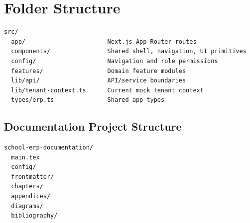\chapter{Folder Structure}
\label{app:folders}
\begin{lstlisting}
src/
  app/                       Next.js App Router routes
  components/                Shared shell, navigation, UI primitives
  config/                    Navigation and role permissions
  features/                  Domain feature modules
  lib/api/                   API/service boundaries
  lib/tenant-context.ts      Current mock tenant context
  types/erp.ts               Shared app types
\end{lstlisting}

\section{Documentation Project Structure}
\begin{lstlisting}
school-erp-documentation/
  main.tex
  config/
  frontmatter/
  chapters/
  appendices/
  diagrams/
  bibliography/
\end{lstlisting}
